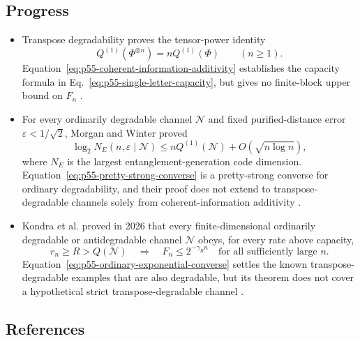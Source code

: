 \subsection*{Progress}

\begin{itemize}
  \item Transpose degradability proves the tensor-power identity
  \begin{equation}
    Q^{(1)}(\Phi^{\otimes n})=nQ^{(1)}(\Phi)
    \qquad(n\geq1).
    \label{eq:p55-coherent-information-additivity}
  \end{equation}
  Equation~\eqref{eq:p55-coherent-information-additivity} establishes the
  capacity formula in Eq.~\eqref{eq:p55-single-letter-capacity}, but gives no
  finite-block upper bound on $F_n$
  .

  \item For every ordinarily degradable channel $\mathcal N$ and fixed
  purified-distance error $\varepsilon<1/\sqrt2$, Morgan and Winter proved
  \begin{equation}
    \log_2 N_E(n,\varepsilon\mid\mathcal N)
      \leq nQ^{(1)}(\mathcal N)+O(\sqrt{n\log n}),
    \label{eq:p55-pretty-strong-converse}
  \end{equation}
  where $N_E$ is the largest entanglement-generation code dimension.
  Equation~\eqref{eq:p55-pretty-strong-converse} is a pretty-strong converse
  for ordinary degradability, and their proof does not extend to
  transpose-degradable channels solely from coherent-information additivity
  .

  \item Kondra et al. proved in 2026 that every finite-dimensional ordinarily
  degradable or antidegradable channel $\mathcal N$ obeys, for every rate above
  capacity,
  \begin{equation}
    r_n\geq R>Q(\mathcal N)
    \quad\Longrightarrow\quad
    F_n\leq2^{-\gamma_R n}
    \quad\text{for all sufficiently large }n.
    \label{eq:p55-ordinary-exponential-converse}
  \end{equation}
  Equation~\eqref{eq:p55-ordinary-exponential-converse} settles the known
  transpose-degradable examples that are also degradable, but its theorem does
  not cover a hypothetical strict transpose-degradable channel
  .
\end{itemize}

\subsection*{References}

